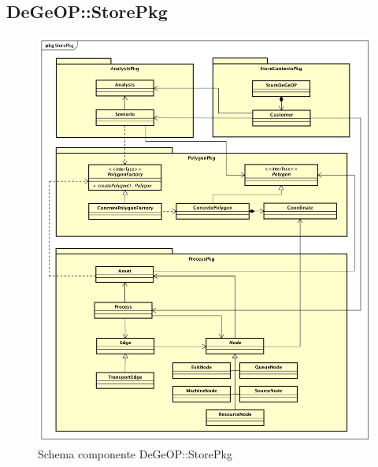 \subsection{DeGeOP::StorePkg}
\label{pkg::StorePkg}
\begin{figure}[H]
	\centering
	\includegraphics[width=\textwidth]{img/PkgDiagram/STStorePkg.png}
	\caption{Schema componente DeGeOP::StorePkg}
\end{figure}
